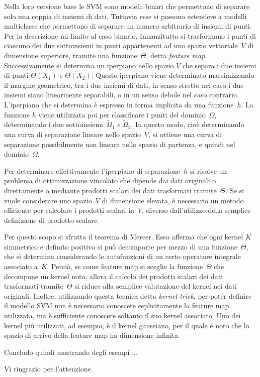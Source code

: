 Nella loro versione base le SVM sono modelli binari che permettono di separare solo una coppia di insiemi di dati.  Tuttavia esse si possono estendere a modelli multiclasse che permettono di separare un numero arbitrario di insiemi di punti.
Per la descrizione mi limito al caso binario.
Innanzitutto si trasformano i punti di ciascuno dei due sottoinsiemi in punti appartenenti ad  uno spazio vettoriale~$V$ di dimensione superiore, tramite una funzione~$\Theta$, detta {\em feature map}.  
 Successivamente si determina un iperpiano nello spazio $V$ che separa i due insiemi di punti $\Theta(X_1)$ e $\Theta(X_2)$.  Questo iperpiano viene determinato massimizzando il margine geometrico, tra i due insiemi di dati, in senso stretto nel caso i due insiemi siano linearmente separabili, o in un senso debole nel caso contrario.
L’iperpiano che si determina è espresso in forma implicita da una funzione~$h$.  La funzione $h$ viene utilizzata poi per classificare i punti del dominio~$\Omega$, determinando i due sottoinsiemi~$\tilde\Omega_1$ e $\tilde\Omega_2$.    
In questo modo, cioè determinando una curva di separazione lineare nello spazio~$V$, si ottiene una curva di separazione possibilmente non lineare nello spazio di partenza, e quindi nel dominio~$\Omega$. 



Per determinare effettivamente l’iperpiano di separazione~$h$ si risolve un problema di ottimizzazione vincolato che dipende dai dati originali o direttamente o  mediante prodotti scalari dei dati trasformati tramite~$\Theta$.   Se si vuole considerare uno spazio~$V$ di dimensione elevata, è necessario un metodo efficiente per calcolare i prodotti scalari in~$V$, diverso dall’utilizzo della semplice definizione di prodotto scalare.

Per questo scopo si sfrutta il teorema di Mercer.  Esso afferma che ogni kernel $K$ simmetrico e definito positivo si può decomporre per mezzo di una funzione~$\Theta$, che si determina considerando le autofunzioni di un certo operatore integrale associato a~$K$.  Perciò, se come feature map si sceglie la funzione~$\Theta$ che decompone un kernel noto, allora il calcolo dei prodotti scalari dei dati trasformati tramite~$\Theta$ si riduce alla semplice valutazione del kernel nei dati originali.  Inoltre, utilizzando questa tecnica detta {\em kernel trick}, per poter definire il modello SVM non è necessario conoscere esplicitamente la feature map utilizzata, ma è sufficiente conoscere soltanto il suo kernel associato.  Uno dei kernel più utilizzati, ad esempio, è il kernel gaussiano, per il quale è noto che lo spazio di arrivo della feature map ha dimensione infinita.

Concludo quindi mostrando degli esempi ...

Vi ringrazio per l’attenzione.



\bye
